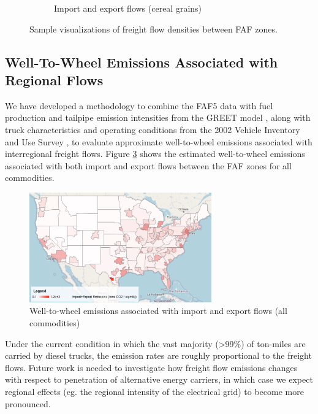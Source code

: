 \begin{figure}[ht]
\begin{subfigure}[b]{0.49\textwidth}
        \caption{Import and export flows (cereal grains)\newline}
        \label{fig:import_emissions}
    \end{subfigure}
    \caption{Sample visualizations of freight flow densities between FAF zones.}
    \label{fig:freight_flows}
\end{figure}

\subsection{Well-To-Wheel Emissions Associated with Regional Flows}

We have developed a methodology to combine the FAF5 data with fuel production and tailpipe emission intensities from the GREET model \cite{GREET_2022}, along with truck characteristics and operating conditions from the 2002 Vehicle Inventory and Use Survey \cite{VIUS_2002}, to evaluate approximate well-to-wheel emissions associated with interregional freight flows. Figure \ref{fig:import_export_emissions} shows the estimated well-to-wheel emissions associated with both import and export flows between the FAF zones for all commodities. 

\begin{figure}[ht]
    \centering
    \includegraphics[width=0.7\textwidth]{figures/import_export_emissions.png}
    \caption{Well-to-wheel emissions associated with import and export flows (all commodities)}
    \label{fig:import_export_emissions}
\end{figure}

Under the current condition in which the vast majority (>99\%) of ton-miles are carried by diesel trucks, the emission rates are roughly proportional to the freight flows. Future work is needed to investigate how freight flow emissions changes with respect to penetration of alternative energy carriers, in which case we expect regional effects (eg. the regional intensity of the electrical grid) to become more pronounced. 

